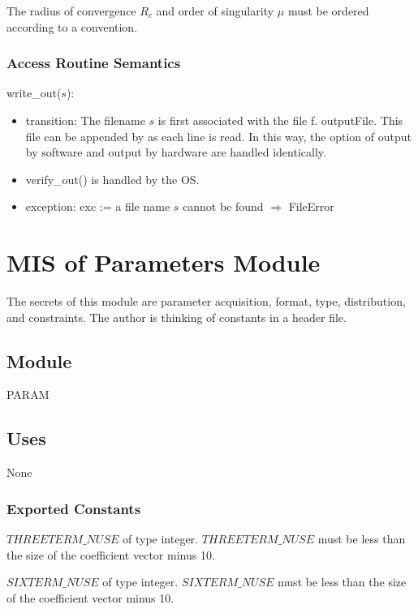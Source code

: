 \documentclass[12pt, titlepage]{article}
\begin{document}
The radius of convergence $R_c$ and order of singularity $\mu$ must be ordered according to a convention.

\subsubsection{Access Routine Semantics}

\noindent write\_out($s$):
\begin{itemize}
\item transition: The filename $s$ is first associated with the file f.  {outputFile}. This file
  can be appended by  as each line is read.
  In this way, the option of output by software and output by hardware are handled identically.
\item verify\_out() is handled by the OS.
\item exception: exc := a file name $s$ cannot be found $\Rightarrow$  FileError
\end{itemize}

\section{MIS of Parameters Module} \label{sc:MIS_PARAM}

The secrets of this module are parameter acquisition, format, type, distribution, and constraints.
The author is thinking of constants in a header file.

\subsection{Module}

PARAM

\subsection{Uses}

None

\subsubsection{Exported Constants}

\noindent $THREETERM\_NUSE$ of type integer. $THREETERM\_NUSE$ must be less than the size of the coefficient vector minus 10.

\noindent $SIXTERM\_NUSE$ of type integer. $SIXTERM\_NUSE$ must be less than the size of the coefficient vector minus 10.
\end{document}
